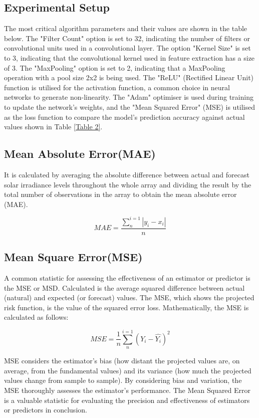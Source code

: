 \documentclass[a4paper,fleqn]{cas-sc}
\begin{document}
\subsection{Experimental Setup} The most critical algorithm parameters and their values are shown in the table below. The "Filter Count" option is set to 32, indicating the number of filters or convolutional units used in a convolutional layer. The option "Kernel Size" is set to 3, indicating that the convolutional kernel used in feature extraction has a size of 3. The "MaxPooling" option is set to 2, indicating that a MaxPooling operation with a pool size 2x2 is being used. The "ReLU" (Rectified Linear Unit) function is utilised for the activation function, a common choice in neural networks to generate non-linearity. The "Adam" optimiser is used during training to update the network's weights, and the "Mean Squared Error" (MSE) is utilised as the loss function to compare the model's prediction accuracy against actual values shown in Table \ref{Table 2}.

\subsection{Mean Absolute Error(MAE)}
It is calculated by averaging the absolute difference between actual and forecast solar irradiance levels throughout the whole array and dividing the result by the total number of observations in the array to obtain the mean absolute error (MAE)\cite{kumari2021deep}.

\begin{equation}
MAE = \frac{\sum_{n}^{i=1}|y_i-x_i|}{n}
\end{equation}

\subsection{Mean Square Error(MSE)}
A common statistic for assessing the effectiveness of an estimator or predictor is the MSE or MSD. Calculated is the average squared difference between actual (natural) and expected (or forecast) values. The MSE, which shows the projected risk function, is the value of the squared error loss\cite{kumari2021deep}.
Mathematically, the MSE is calculated as follows:

\begin{equation}
MSE = \frac{1}{n}\sum_{n}^{i=1}(Y_i-\hat{Y_i})^{2}
\end{equation}\cite{8558187}

MSE considers the estimator's bias (how distant the projected values are, on average, from the fundamental values) and its variance (how much the projected values change from sample to sample). By considering bias and variation, the MSE thoroughly assesses the estimator's performance. The Mean Squared Error is a valuable statistic for evaluating the precision and effectiveness of estimators or predictors in conclusion.\cite{gupta2023long}
\end{document}
